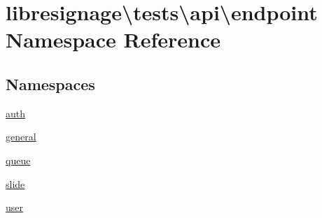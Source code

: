 \hypertarget{namespacelibresignage_1_1tests_1_1api_1_1endpoint}{}\section{libresignage\textbackslash{}tests\textbackslash{}api\textbackslash{}endpoint Namespace Reference}
\label{namespacelibresignage_1_1tests_1_1api_1_1endpoint}
\subsection*{Namespaces}
\begin{DoxyCompactItemize}
\item 
 \hyperlink{namespacelibresignage_1_1tests_1_1api_1_1endpoint_1_1auth}{auth}
\item 
 \hyperlink{namespacelibresignage_1_1tests_1_1api_1_1endpoint_1_1general}{general}
\item 
 \hyperlink{namespacelibresignage_1_1tests_1_1api_1_1endpoint_1_1queue}{queue}
\item 
 \hyperlink{namespacelibresignage_1_1tests_1_1api_1_1endpoint_1_1slide}{slide}
\item 
 \hyperlink{namespacelibresignage_1_1tests_1_1api_1_1endpoint_1_1user}{user}
\end{DoxyCompactItemize}
